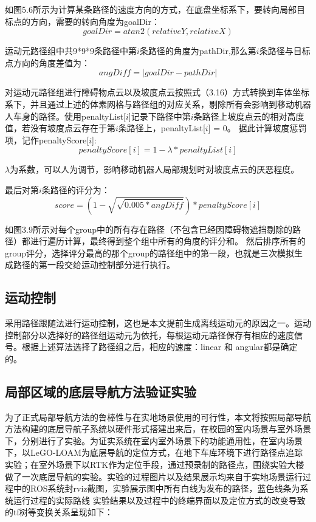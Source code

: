 如图5.6所示为计算某条路径的速度方向的方式，在底盘坐标系下，要转向局部目标点的方向，需要的转向角度为goalDir：
\begin{equation}
    goalDir = atan2(relativeY, relativeX)
\end{equation}

运动元路径组中共9*9*9条路径中第$i$条路径的角度为pathDir,那么第$i$条路径与目标点方向的角度差值为：
\begin{equation}
    angDiff = \left\lvert goalDir - pathDir\right\rvert 
\end{equation}

对运动元路径组进行障碍物点云以及坡度点云按照式（3.16）方式转换到车体坐标系下，并且通过上述的体素网格与路径组的对应关系，剔除所有会影响到移动机器人车身的路径。使用penaltyList[$i$]记录下路径中第$i$条路径上坡度点云的相对高度值，若没有坡度点云存在于第$i$条路径上，penaltyList[$i$] = 0。
据此计算坡度惩罚项，记作penaltyScore[$i$]:
\begin{equation}
    penaltyScore\left[i\right] = 1 - \lambda * penaltyList\left[i\right] 
\end{equation}

$\lambda$为系数，可以人为调节，影响移动机器人局部规划时对坡度点云的厌恶程度。

最后对第$i$条路径的评分为：
\begin{equation}
    score = (1 - \sqrt{\sqrt{0.005*angDiff}})*penaltyScore\left[i\right]
\end{equation}

如图3.9所示对每个group中的所有存在路径（不包含已经因障碍物遮挡剔除的路径）都进行遍历计算，最终得到整个组中所有的角度的评分和。
然后排序所有的group评分，选择评分最高的那个group的路径组中的第一段，也就是三次模拟生成路径的第一段交给运动控制部分进行执行。







\subsection{运动控制}
采用路径跟随法进行运动控制，这也是本文提前生成离线运动元的原因之一。运动控制部分以选择好的路径组运动元为依托，每根运动元路径保存有相应的速度信号。根据上述算法选择了路径组之后，相应的速度：linear 和 angular都是确定的。

\subsection{局部区域的底层导航方法验证实验}
为了正式局部导航方法的鲁棒性与在实地场景使用的可行性，本文将按照局部导航方法构建的底层导航子系统以硬件形式搭建出来后，在校园的室内场景与室外场景下，分别进行了实验。为证实系统在室内室外场景下的功能通用性，在室内场景下，以LeGO-LOAM为底层导航的定位方式，在地下车库环境下进行路径点追踪实验；在室外场景下以RTK作为定位手段，通过预录制的路径点，围绕实验大楼做了一次底层导航的实验。实验的过程图片以及结果展示均来自于实地场景运行过程中的ROS系统封rviz截图，实验展示图中所有白线为发布的路径，蓝色线条为系统运行过程的实际路线
实验结果以及过程中的终端界面以及定位方式的改变导致的tf树等变换关系呈现如下：
